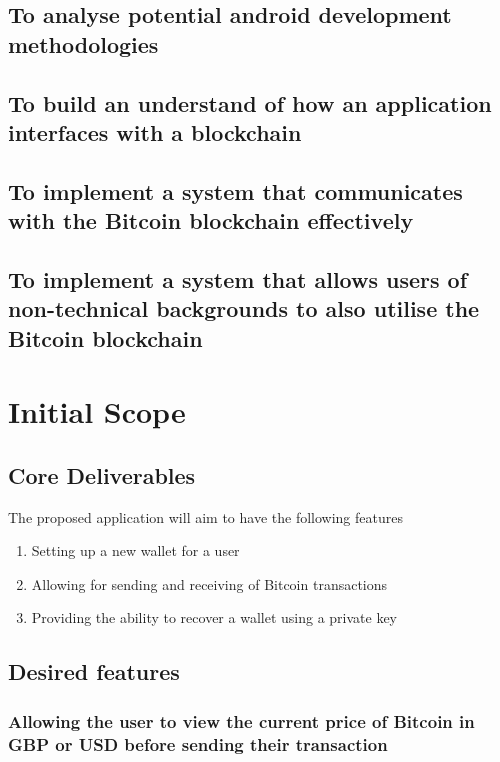 \documentclass[11pt]{article}
\begin{document}
\subsection{To analyse potential android development methodologies}
\label{sec:org7823110}
\subsection{To build an understand of how an application interfaces with a blockchain}
\label{sec:org24b3956}
\subsection{To implement a system that communicates with the Bitcoin blockchain effectively}
\label{sec:org2f32b0e}
\subsection{To implement a system that allows users of non-technical backgrounds to also utilise the Bitcoin blockchain}
\label{sec:org3430e6a}


\section{Initial Scope}
\label{sec:orga45b262}
\subsection{Core Deliverables}
\label{sec:orgccfe72b}
The proposed application will aim to have the following features
\begin{enumerate}
\item Setting up a new wallet for a user
\label{sec:org511c7f4}
\item Allowing for sending and receiving of Bitcoin transactions
\label{sec:org3f569d6}
\item Providing the ability to recover a wallet using a private key
\label{sec:org0f05e87}
\end{enumerate}
\subsection{Desired features}
\label{sec:org311bc54}
\subsubsection{Allowing the user to view the current price of Bitcoin in GBP or USD before sending their transaction}
\label{sec:org77a2a9e}
\end{document}
